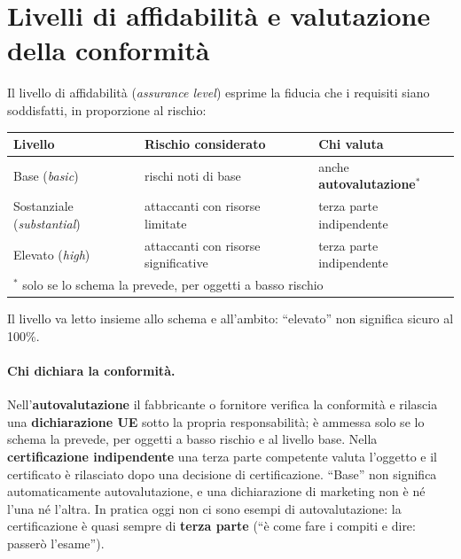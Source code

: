 \section{Livelli di affidabilità e valutazione della conformità}
\label{sec:csa-livelli}

Il livello di affidabilità (\emph{assurance level}) esprime la fiducia che i requisiti siano soddisfatti,
in proporzione al rischio:
\begin{center}
\small
\begin{tabular}{lll}
\toprule
\textbf{Livello} & \textbf{Rischio considerato} & \textbf{Chi valuta}\\
\midrule
Base (\emph{basic}) & rischi noti di base & anche \textbf{autovalutazione}$^{*}$\\
Sostanziale (\emph{substantial}) & attaccanti con risorse limitate & terza parte indipendente\\
Elevato (\emph{high}) & attaccanti con risorse significative & terza parte indipendente\\
\bottomrule
\multicolumn{3}{l}{\footnotesize $^{*}$ solo se lo schema la prevede, per oggetti a basso rischio}\\
\end{tabular}
\end{center}
Il livello va letto insieme allo schema e all'ambito: ``elevato'' non significa sicuro al 100\%.

\paragraph{Chi dichiara la conformità.} Nell'\textbf{autovalutazione} il fabbricante o fornitore verifica
la conformità e rilascia una \textbf{dichiarazione UE} sotto la propria responsabilità; è ammessa solo se
lo schema la prevede, per oggetti a basso rischio e al livello base. Nella \textbf{certificazione
indipendente} una terza parte competente valuta l'oggetto e il certificato è rilasciato dopo una
decisione di certificazione. ``Base'' non significa automaticamente autovalutazione, e una dichiarazione
di marketing non è né l'una né l'altra. In pratica oggi non ci sono esempi di autovalutazione: la
certificazione è quasi sempre di \textbf{terza parte} (``è come fare i compiti e dire: passerò
l'esame'').

